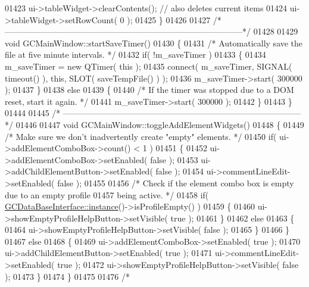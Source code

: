 \begin{DoxyCode}
{{{{{{{01423   ui->tableWidget->clearContents();   \textcolor{comment}{// also deletes current items}
01424   ui->tableWidget->setRowCount( 0 );
01425 \}
01426 
01427 \textcolor{comment}{/*
      --------------------------------------------------------------------------------------*/}
01428 
01429 \textcolor{keywordtype}{void} GCMainWindow::startSaveTimer()
01430 \{
01431   \textcolor{comment}{/* Automatically save the file at five minute intervals. */}
01432   \textcolor{keywordflow}{if}( !m\_saveTimer )
01433   \{
01434     m\_saveTimer = \textcolor{keyword}{new} QTimer( \textcolor{keyword}{this} );
01435     connect( m\_saveTimer, SIGNAL( timeout() ), \textcolor{keyword}{this}, SLOT( saveTempFile() ) );
01436     m\_saveTimer->start( 300000 );
01437   \}
01438   \textcolor{keywordflow}{else}
01439   \{
01440     \textcolor{comment}{/* If the timer was stopped due to a DOM reset, start it again. */}
01441     m\_saveTimer->start( 300000 );
01442   \}
01443 \}
01444 
01445 \textcolor{comment}{/*
      --------------------------------------------------------------------------------------*/}
01446 
01447 \textcolor{keywordtype}{void} GCMainWindow::toggleAddElementWidgets()
01448 \{
01449   \textcolor{comment}{/* Make sure we don't inadvertently create "empty" elements. */}
01450   \textcolor{keywordflow}{if}( ui->addElementComboBox->count() < 1 )
01451   \{
01452     ui->addElementComboBox->setEnabled( \textcolor{keyword}{false} );
01453     ui->addChildElementButton->setEnabled( \textcolor{keyword}{false} );
01454     ui->commentLineEdit->setEnabled( \textcolor{keyword}{false} );
01455 
01456     \textcolor{comment}{/* Check if the element combo box is empty due to an empty profile}
01457 \textcolor{comment}{      being active. */}
01458     \textcolor{keywordflow}{if}( \hyperlink{class_g_c_data_base_interface_a1baea9c0667aa8b610ec30076fcab84c}{GCDataBaseInterface::instance}()->isProfileEmpty() )
01459     \{
01460       ui->showEmptyProfileHelpButton->setVisible( \textcolor{keyword}{true} );
01461     \}
01462     \textcolor{keywordflow}{else}
01463     \{
01464       ui->showEmptyProfileHelpButton->setVisible( \textcolor{keyword}{false} );
01465     \}
01466   \}
01467   \textcolor{keywordflow}{else}
01468   \{
01469     ui->addElementComboBox->setEnabled( \textcolor{keyword}{true} );
01470     ui->addChildElementButton->setEnabled( \textcolor{keyword}{true} );
01471     ui->commentLineEdit->setEnabled( \textcolor{keyword}{true} );
01472     ui->showEmptyProfileHelpButton->setVisible( \textcolor{keyword}{false} );
01473   \}
01474 \}
01475 
01476 \textcolor{comment}{/*
}}}}}}}}
\end{DoxyCode}
